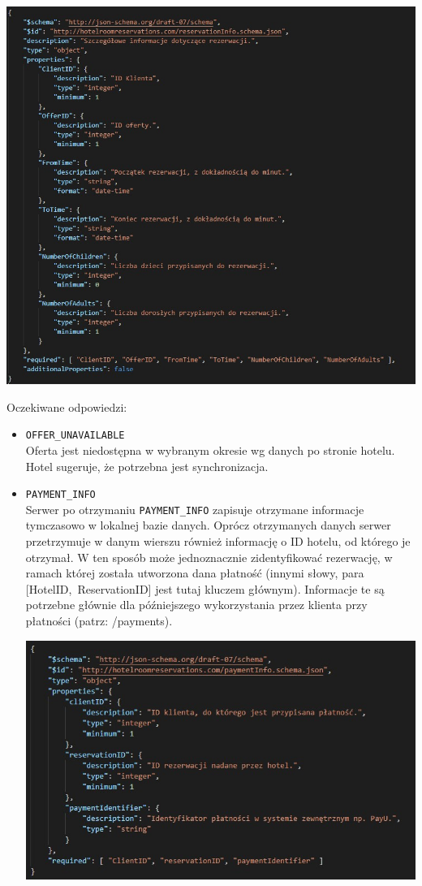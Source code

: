 \documentclass{article}
\begin{document}
\includegraphics[width=\linewidth]{Rezerwacje/ReservationInfoSchema.jpg}

Oczekiwane odpowiedzi:
\begin{itemize}
    \item \texttt{OFFER\_UNAVAILABLE} \\
    Oferta jest niedostępna w wybranym okresie wg danych po stronie hotelu. Hotel sugeruje, że potrzebna jest synchronizacja.
    \item \texttt{PAYMENT\_INFO} \\
    Serwer po otrzymaniu \texttt{PAYMENT\_INFO} zapisuje otrzymane informacje tymczasowo w lokalnej bazie danych. Oprócz otrzymanych danych serwer przetrzymuje w danym wierszu również informację o ID hotelu, od którego je otrzymał. W ten sposób może jednoznacznie zidentyfikować rezerwację, w ramach której została utworzona dana płatność (innymi słowy, para [HotelID,~ReservationID] jest tutaj kluczem głównym). Informacje te są potrzebne głównie dla późniejszego wykorzystania przez klienta przy płatności (patrz: /payments).
    
    \includegraphics[width=\linewidth]{Rezerwacje/paymentInfo.jpg}
\end{itemize}
\end{document}
